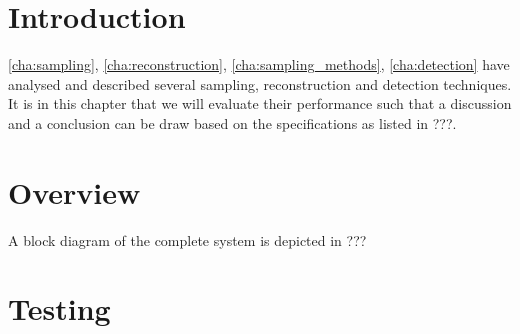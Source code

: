 \documentclass[a4paper, openany, oneside]{memoir}
\begin{document}
\section{Introduction}

\cref{cha:sampling}, \cref{cha:reconstruction}, \cref{cha:sampling_methods}, \cref{cha:detection} have analysed and described several
sampling, reconstruction and detection techniques. It is in this chapter that we will evaluate their performance such that a discussion and a conclusion can be draw based on the specifications as listed in ???.

\section{Overview}
A block diagram of the complete system is depicted in ???

\section{Testing}
\end{document}
